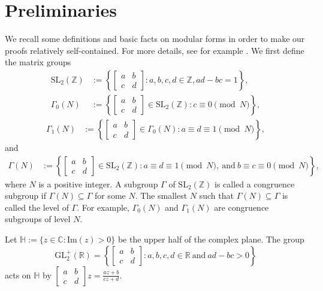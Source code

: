 \documentclass[reqno]{amsart}
\theoremstyle{definition}
\theoremstyle{remark}
\numberwithin{equation}{section}
\begin{document}
\section{Preliminaries}
We recall some definitions and basic facts on modular forms in order to make our proofs relatively self-contained. For more details, see for example \cite{koblitz1993, ono2004}. We first define the matrix groups 
\begin{align*}
\text{SL}_2(\mathbb{Z}) & :=\left\{\begin{bmatrix}
a  &  b \\
c  &  d      
\end{bmatrix}: a, b, c, d \in \mathbb{Z}, ad-bc=1
\right\},\\
\Gamma_{0}(N) & :=\left\{
\begin{bmatrix}
a  &  b \\
c  &  d      
\end{bmatrix} \in \text{SL}_2(\mathbb{Z}) : c\equiv 0\pmod N \right\},
\end{align*}
\begin{align*}
\Gamma_{1}(N) & :=\left\{
\begin{bmatrix}
a  &  b \\
c  &  d      
\end{bmatrix} \in \Gamma_0(N) : a\equiv d\equiv 1\pmod N \right\},
\end{align*}
and 
\begin{align*}\Gamma(N) & :=\left\{
\begin{bmatrix}
a  &  b \\
c  &  d      
\end{bmatrix} \in \text{SL}_2(\mathbb{Z}) : a\equiv d\equiv 1\pmod N, ~\text{and}~ b\equiv c\equiv 0\pmod N\right\},
\end{align*}
where $N$ is a positive integer. A subgroup $\Gamma$ of $\text{SL}_2(\mathbb{Z})$ is called a congruence subgroup if $\Gamma(N)\subseteq \Gamma$ for some $N$. 
The smallest $N$ such that $\Gamma(N)\subseteq \Gamma$
is called the level of $\Gamma$. For example, $\Gamma_0(N)$ and $\Gamma_1(N)$
are congruence subgroups of level $N$. 
\par Let $\mathbb{H}:=\{z\in \mathbb{C}: \text{Im}(z)>0\}$ be the upper half of the complex plane. The group $$\text{GL}_2^{+}(\mathbb{R})=\left\{\begin{bmatrix}
a  &  b \\
c  &  d      
\end{bmatrix}: a, b, c, d\in \mathbb{R}~\text{and}~ad-bc>0\right\}$$ acts on $\mathbb{H}$ by $\begin{bmatrix}
a  &  b \\
c  &  d      
\end{bmatrix} z=\displaystyle \frac{az+b}{cz+d}$.  
\end{document}

